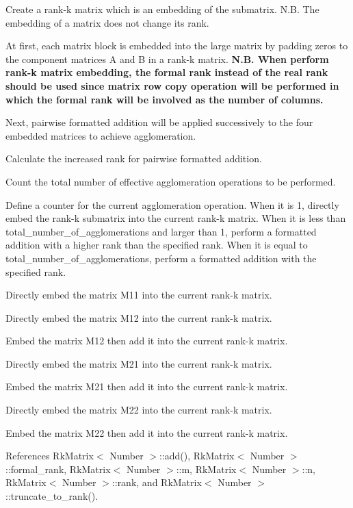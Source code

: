 Create a rank-\/k matrix which is an embedding of the submatrix. N.\+B. The embedding of a matrix does not change its rank.

At first, each matrix block is embedded into the large matrix by padding zeros to the component matrices {\ttfamily A} and {\ttfamily B} in a rank-\/k matrix. {\bfseries N.\+B. When perform rank-\/k matrix embedding, the formal rank instead of the real rank should be used since matrix row copy operation will be performed in which the formal rank will be involved as the number of columns.}

Next, pairwise formatted addition will be applied successively to the four embedded matrices to achieve agglomeration.

Calculate the increased rank for pairwise formatted addition.

Count the total number of effective agglomeration operations to be performed.

Define a counter for the current agglomeration operation. When it is 1, directly embed the rank-\/k submatrix into the current rank-\/k matrix. When it is less than {\ttfamily total\+\_\+number\+\_\+of\+\_\+agglomerations} and larger than 1, perform a formatted addition with a higher rank than the specified rank. When it is equal to {\ttfamily total\+\_\+number\+\_\+of\+\_\+agglomerations}, perform a formatted addition with the specified rank.

Directly embed the matrix {\ttfamily M11} into the current rank-\/k matrix.

Directly embed the matrix {\ttfamily M12} into the current rank-\/k matrix.

Embed the matrix {\ttfamily M12} then add it into the current rank-\/k matrix.

Directly embed the matrix {\ttfamily M21} into the current rank-\/k matrix.

Embed the matrix {\ttfamily M21} then add it into the current rank-\/k matrix.

Directly embed the matrix {\ttfamily M22} into the current rank-\/k matrix.

Embed the matrix {\ttfamily M22} then add it into the current rank-\/k matrix.

References Rk\+Matrix$<$ Number $>$\+::add(), Rk\+Matrix$<$ Number $>$\+::formal\+\_\+rank, Rk\+Matrix$<$ Number $>$\+::m, Rk\+Matrix$<$ Number $>$\+::n, Rk\+Matrix$<$ Number $>$\+::rank, and Rk\+Matrix$<$ Number $>$\+::truncate\+\_\+to\+\_\+rank().

\mbox{\label{classRkMatrix_a00a2465dfb9445dca842f19fc757d008}} 
